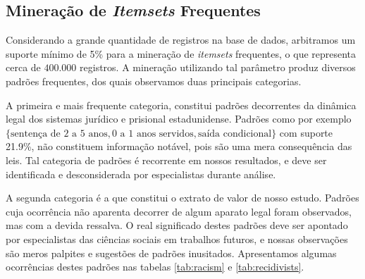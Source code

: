 \documentclass[12pt]{article}
\begin{document}
\subsection{Mineração de \textit{Itemsets} Frequentes}
Considerando a grande quantidade de registros na base de dados, arbitramos um suporte mínimo de 5\% para a mineração de \textit{itemsets} frequentes, o que representa cerca de $400.000$ registros. A mineração utilizando tal parâmetro produz diversos padrões frequentes, dos quais observamos duas principais categorias.

A primeira e mais frequente categoria, constitui padrões decorrentes da dinâmica legal dos sistemas jurídico e prisional estadunidense. Padrões como por exemplo $\{ \text{sentença de 2 a 5 anos}, \text{0 a 1 anos servidos}, \text{saída condicional} \}$ com suporte 21.9\%, não constituem informação notável, pois são uma mera consequência das leis. Tal categoria de padrões é recorrente em nossos resultados, e deve ser identificada e desconsiderada por especialistas durante análise.

A segunda categoria é a que constitui o extrato de valor de nosso estudo. Padrões cuja ocorrência não aparenta decorrer de algum aparato legal foram observados, mas com a devida ressalva. O real significado destes padrões deve ser apontado por especialistas das ciências sociais em trabalhos futuros, e nossas observações são meros palpites e sugestões de padrões inusitados. Apresentamos algumas ocorrências destes padrões nas tabelas \ref{tab:racism} e \ref{tab:recidivists}. \vspace{-9pt}
\end{document}
